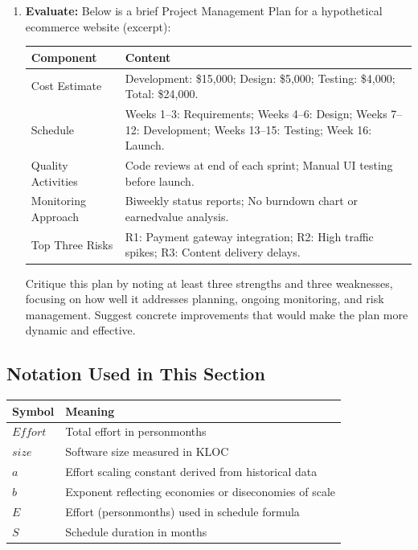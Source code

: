 \documentclass[12pt, a4paper]{article}
\begin{document}
\begin{enumerate}
\newpage

\item \textbf{Evaluate:} Below is a brief Project Management Plan for a hypothetical ecommerce website (excerpt):

\begin{tabular}{|p{3cm}|p{9cm}|}
\hline
\textbf{Component} & \textbf{Content} \\
\hline
Cost Estimate & Development: \$15,000; Design: \$5,000; Testing: \$4,000; Total: \$24,000. \\
\hline
Schedule & Weeks 1--3: Requirements; Weeks 4--6: Design; Weeks 7--12: Development; Weeks 13--15: Testing; Week 16: Launch. \\
\hline
Quality Activities & Code reviews at end of each sprint; Manual UI testing before launch. \\
\hline
Monitoring Approach & Biweekly status reports; No burndown chart or earnedvalue analysis. \\
\hline
Top Three Risks & R1: Payment gateway integration; R2: High traffic spikes; R3: Content delivery delays. \\
\hline
\end{tabular}

Critique this plan by noting at least three strengths and three weaknesses, focusing on how well it addresses planning, ongoing monitoring, and risk management. Suggest concrete improvements that would make the plan more dynamic and effective.

\end{enumerate}

\newpage

\subsection*{Notation Used in This Section}
\begin{tabular}{@{}ll@{}}
\toprule
Symbol & Meaning \\ \midrule
    $Effort$ & Total effort in personmonths \\
    $size$ & Software size measured in KLOC \\
    $a$ & Effort scaling constant derived from historical data \\
    $b$ & Exponent reflecting economies or diseconomies of scale \\
    $E$ & Effort (personmonths) used in schedule formula \\
    $S$ & Schedule duration in months \\
\bottomrule
\end{tabular}
\vspace{1em}
\end{document}
